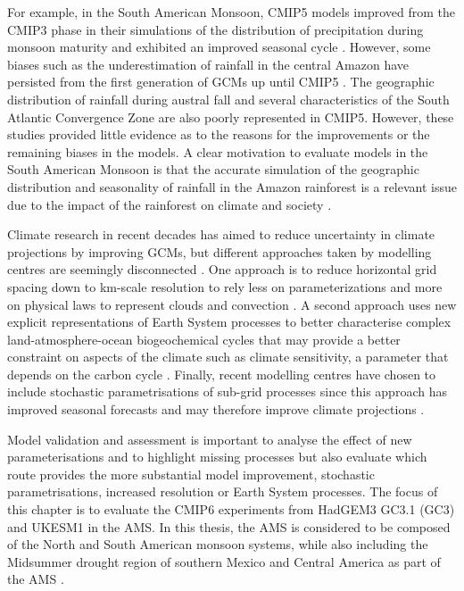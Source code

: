 For example, in the South American Monsoon, CMIP5 models improved from the CMIP3 phase in their simulations of the distribution of precipitation during monsoon maturity and exhibited an improved seasonal cycle \citep{jones2013,yin2013}. However, some biases such as the underestimation of rainfall in the central Amazon have persisted from the first generation of GCMs up until CMIP5 \citep{li2006,yin2013}. The geographic distribution of rainfall during  austral fall and several characteristics of the South Atlantic Convergence Zone are also poorly represented in CMIP5. However, these studies provided little evidence as to the reasons for the improvements or the remaining biases in the models. 
A clear motivation to evaluate models in the South American Monsoon is that the accurate simulation of the geographic distribution and seasonality of rainfall in the Amazon rainforest is a relevant issue due to the impact of the rainforest on climate and society \citep[e.g.][]{li2006,Malhi20610,yin2013}.

Climate research in recent decades has aimed to reduce uncertainty in climate projections by improving GCMs, but different approaches taken by modelling centres are seemingly disconnected \citep{jakob2014}. One approach is to reduce horizontal grid spacing down to km-scale resolution to rely less on parameterizations and more on physical laws to represent clouds and convection \citep{palmer2019}. A second approach uses new explicit representations of Earth System processes to better characterise complex land-atmosphere-ocean biogeochemical cycles that may provide a better constraint on aspects of the climate such as climate sensitivity, a parameter that depends on the carbon cycle \citep{marotzke2017,sellar2019,andrews2019}. Finally, recent modelling centres have chosen to include  stochastic  parametrisations of sub-grid processes since this approach has improved seasonal forecasts and may therefore improve climate projections \citep{palmer2019st}. 

Model validation and assessment is important to analyse the effect of new parameterisations and to highlight missing processes but also evaluate which route provides the more substantial model improvement, stochastic parametrisations, increased resolution or Earth System processes.
The focus of this chapter is to evaluate the CMIP6 experiments from HadGEM3 GC3.1 (GC3) and UKESM1 in the AMS. In this thesis, the AMS is considered to be composed of the North and South American monsoon systems, while also including the Midsummer drought region of southern Mexico and Central America as part of the AMS \citep[as in e.g.][]{vera2006,pascale2019}.

